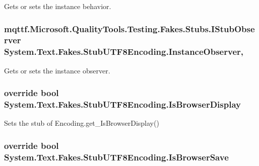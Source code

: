 Gets or sets the instance behavior.

\hypertarget{class_system_1_1_text_1_1_fakes_1_1_stub_u_t_f8_encoding_a59b6eb0ce4affec658f8727f4f47ed84}{
\subsubsection[{Instance\-Observer}]{\setlength{\rightskip}{0pt plus 5cm}mqttf.\-Microsoft.\-Quality\-Tools.\-Testing.\-Fakes.\-Stubs.\-I\-Stub\-Observer System.\-Text.\-Fakes.\-Stub\-U\-T\-F8\-Encoding.\-Instance\-Observer\hspace{0.3cm}{\ttfamily [get]}, {\ttfamily [set]}}}\label{class_system_1_1_text_1_1_fakes_1_1_stub_u_t_f8_encoding_a59b6eb0ce4affec658f8727f4f47ed84}


Gets or sets the instance observer.

\hypertarget{class_system_1_1_text_1_1_fakes_1_1_stub_u_t_f8_encoding_a04d442c217352e81834dadb3aa376fc4}{
\subsubsection[{Is\-Browser\-Display}]{\setlength{\rightskip}{0pt plus 5cm}override bool System.\-Text.\-Fakes.\-Stub\-U\-T\-F8\-Encoding.\-Is\-Browser\-Display\hspace{0.3cm}{\ttfamily [get]}}}\label{class_system_1_1_text_1_1_fakes_1_1_stub_u_t_f8_encoding_a04d442c217352e81834dadb3aa376fc4}


Sets the stub of Encoding.\-get\-\_\-\-Is\-Browser\-Display()

\hypertarget{class_system_1_1_text_1_1_fakes_1_1_stub_u_t_f8_encoding_a25a5e99f6322f8a407dceb45ca072a69}{
\subsubsection[{Is\-Browser\-Save}]{\setlength{\rightskip}{0pt plus 5cm}override bool System.\-Text.\-Fakes.\-Stub\-U\-T\-F8\-Encoding.\-Is\-Browser\-Save\hspace{0.3cm}{\ttfamily [get]}}}\label{class_system_1_1_text_1_1_fakes_1_1_stub_u_t_f8_encoding_a25a5e99f6322f8a407dceb45ca072a69}


